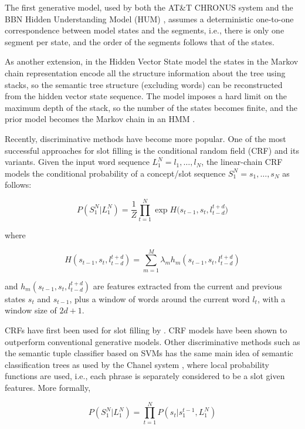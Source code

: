 The first generative model, used by both the AT\&T CHRONUS system \citep{rnn31} and the
BBN Hidden Understanding Model (HUM) \citep{rnn35}, assumes a deterministic one-to-one
correspondence between model states and the segments, i.e., there is only one
segment per state, and the order of the segments follows that of the states.  

As another extension, in the Hidden Vector State model the states in the
Markov chain representation encode all the structure information about the
tree using stacks, so the semantic tree structure (excluding words) can be
reconstructed from the hidden vector state sequence. The model imposes a hard
limit on the maximum depth of the stack, so the number of the states becomes
finite, and the prior model becomes the Markov chain in an HMM \citep{rnn33}.

Recently, discriminative methods have become more popular. One of the most
successful approaches for slot filling is the conditional random field (CRF)
\citep{rnn6} and its variants. Given the input word sequence $L_1^N=l_1,\dots,l_N$, the
linear-chain CRF models the conditional probability of a concept/slot sequence
$S_1^N=s_1,\dots,s_N$ as follows:

\begin{equation}
P(S_{1}^{N}\vert L_{1}^{N}) = \frac{1}{Z}\prod_{t=1}^{N}\exp{H(s_{t-1}, s_{t}, l_{t-d}^{t+d}})
\label{eq:crf1}
\end{equation}

where

\begin{equation}
H(s_{t-1}, s_{t}, l_{t-d}^{t+d}) = \sum_{m=1}^{M}\lambda_{m}h_{m}(s_{t-1}, s_{t}, l_{t-d}^{t+d})
\label{eq:crf2}
\end{equation}

and $h_m (s_{t-1},s_t,l_{t-d}^{t+d})$ are features extracted from the current and
previous states $s_t$ and $s_{t-1}$, plus a window of words around the current word
$l_t$, with a window size of $2d+1$.

CRFs have first been used for slot filling by \citep{rnn33}. CRF
models have been shown to outperform conventional generative models. Other
discriminative methods such as the semantic tuple classifier based on SVMs \citep{rnn36}
has the same main idea of semantic classification trees as used by the Chanel
system \citep{rnn37}, where local probability functions are used, i.e., each phrase is
separately considered to be a slot given features. More formally,

\begin{equation}
P(S_{1}^{N}\vert L_{1}^{N}) = \prod_{t=1}^{N} P(s_{t} \vert s_{1}^{t-1}, L_{1}^{N})
\end{equation}

